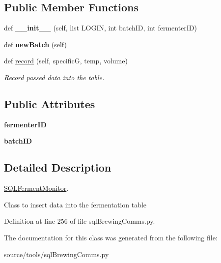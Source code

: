 \subsection*{Public Member Functions}
\begin{DoxyCompactItemize}
\item 
\mbox{\label{classsql_brewing_comms_1_1_s_q_l_ferment_monitor_a94b09118b9bb4e660d2f52da85ad5c55}} 
def {\bfseries \+\_\+\+\_\+init\+\_\+\+\_\+} (self, list L\+O\+G\+IN, int batch\+ID, int fermenter\+ID)
\item 
\mbox{\label{classsql_brewing_comms_1_1_s_q_l_ferment_monitor_a31d20f2c5a723399374f82e87348f981}} 
def {\bfseries new\+Batch} (self)
\item 
\mbox{\label{classsql_brewing_comms_1_1_s_q_l_ferment_monitor_a23281af638d52ad82669c53d0e54a785}} 
def \mbox{\hyperlink{classsql_brewing_comms_1_1_s_q_l_ferment_monitor_a23281af638d52ad82669c53d0e54a785}{record}} (self, specificG, temp, volume)
\begin{DoxyCompactList}\small\item\em Record passed data into the table. \end{DoxyCompactList}\end{DoxyCompactItemize}
\subsection*{Public Attributes}
\begin{DoxyCompactItemize}
\item 
\mbox{\label{classsql_brewing_comms_1_1_s_q_l_ferment_monitor_a80183d9bc8cfdc726741cc70a8e1035e}} 
{\bfseries fermenter\+ID}
\item 
\mbox{\label{classsql_brewing_comms_1_1_s_q_l_ferment_monitor_a9af5181f963a7cd78cf69a1674b0022e}} 
{\bfseries batch\+ID}
\end{DoxyCompactItemize}


\subsection{Detailed Description}
\mbox{\hyperlink{classsql_brewing_comms_1_1_s_q_l_ferment_monitor}{S\+Q\+L\+Ferment\+Monitor}}. 

Class to insert data into the fermentation table 

Definition at line 256 of file sql\+Brewing\+Comms.\+py.



The documentation for this class was generated from the following file\+:\begin{DoxyCompactItemize}
\item 
source/tools/sql\+Brewing\+Comms.\+py\end{DoxyCompactItemize}
